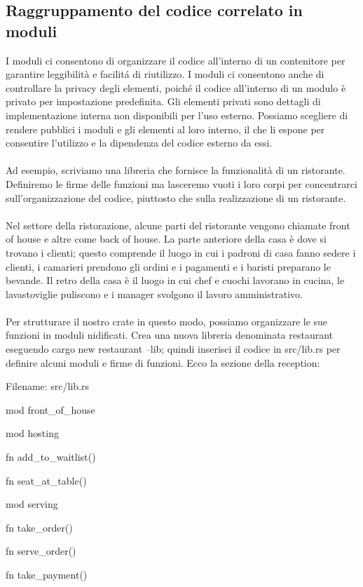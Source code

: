 \documentclass[11pt,a4paper]{article}
\begin{document}
\subsection{Raggruppamento del codice correlato in moduli}
I moduli ci consentono di organizzare il codice all'interno di un contenitore per garantire leggibilità e facilitá di riutilizzo. I moduli ci consentono anche di controllare la privacy degli elementi, poiché il codice all'interno di un modulo è privato per impostazione predefinita. Gli elementi privati sono dettagli di implementazione interna non disponibili per l'uso esterno. Possiamo scegliere di rendere pubblici i moduli e gli elementi al loro interno, il che li espone per consentire l'utilizzo e la dipendenza del codice esterno da essi.\\
\\
Ad esempio, scriviamo una libreria che fornisce la funzionalità di un ristorante. Definiremo le firme delle funzioni ma lasceremo vuoti i loro corpi per concentrarci sull’organizzazione del codice, piuttosto che sulla realizzazione di un ristorante.\\
\\
Nel settore della ristorazione, alcune parti del ristorante vengono chiamate front of house e altre come back of house. La parte anteriore della casa è dove si trovano i clienti; questo comprende il luogo in cui i padroni di casa fanno sedere i clienti, i camarieri prendono gli ordini e i pagamenti e i baristi preparano le bevande. Il retro della casa è il luogo in cui chef e cuochi lavorano in cucina, le lavastoviglie puliscono e i manager svolgono il lavoro amministrativo.\\
\\
Per strutturare il nostro crate in questo modo, possiamo organizzare le sue funzioni in moduli nidificati. Crea una nuova libreria denominata restaurant eseguendo cargo new restaurant --lib; quindi inserisci il codice in src/lib.rs per definire alcuni moduli e firme di funzioni. Ecco la sezione della reception:
\begin{rust}
Filename: src/lib.rs

mod front_of_house {
    mod hosting {
        fn add_to_waitlist() {}

        fn seat_at_table() {}
    }

    mod serving {
        fn take_order() {}

        fn serve_order() {}

        fn take_payment() {}
    }
}
\end{rust}
\end{document}
